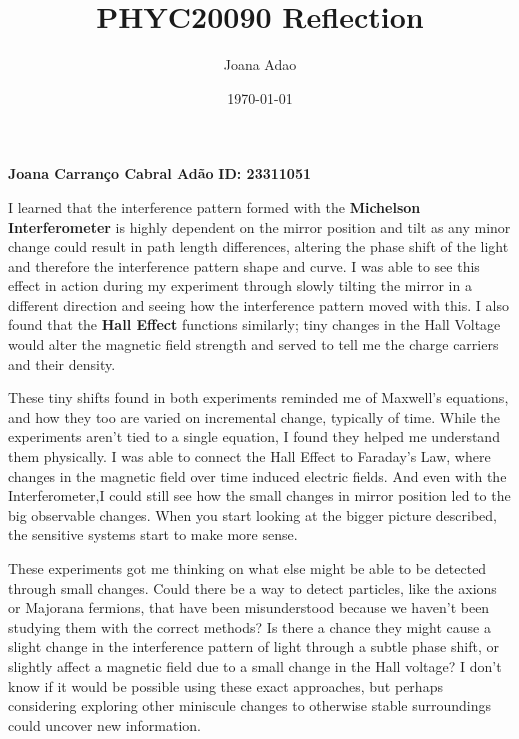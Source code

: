 \documentclass[12pt]{article}
\title{PHYC20090 Reflection}
\author{Joana Adao}
\date{\today}
\begin{document}
\thispagestyle{empty}

\textbf{Joana Carranço Cabral Adão}
\hfill
\textbf{ID: 23311051}

\vspace{2cm}

I learned that the interference pattern formed with the \textbf{Michelson Interferometer} is highly dependent on the mirror position and tilt as any minor change could result in path length differences, altering the phase
shift of the light and therefore the interference pattern shape and curve. I was able to see this effect in action during my experiment through slowly tilting the mirror in a different direction and seeing how the interference pattern
moved with this. I also found that the \textbf{Hall Effect} functions  similarly; tiny changes in the Hall Voltage would alter the magnetic field strength and served to tell me the charge carriers and their density.

These tiny shifts found in both experiments reminded me of Maxwell's equations, and how they too are varied on incremental change, typically of time. While the experiments aren't tied to a single equation,
I found they helped me understand them physically. I was able to connect the Hall Effect to Faraday's Law, where changes in the magnetic field over time induced electric fields. 
And even with the Interferometer,I could still see how the small changes in mirror position led to the big observable changes. When you start looking at the bigger picture described, the sensitive systems start to make more sense.

These experiments got me thinking on what else might be able to be detected through small changes. 
Could there be a way to detect particles, like the axions or Majorana fermions, that have been misunderstood because we haven't been studying them with the correct methods?
Is there a chance they might cause a slight change in the interference pattern of light through a subtle phase shift, or slightly affect a magnetic field due to a small change in the Hall voltage?
I don't know if it would be possible using these exact approaches, but perhaps considering exploring other miniscule changes to otherwise stable surroundings could uncover new information.
\end{document}
